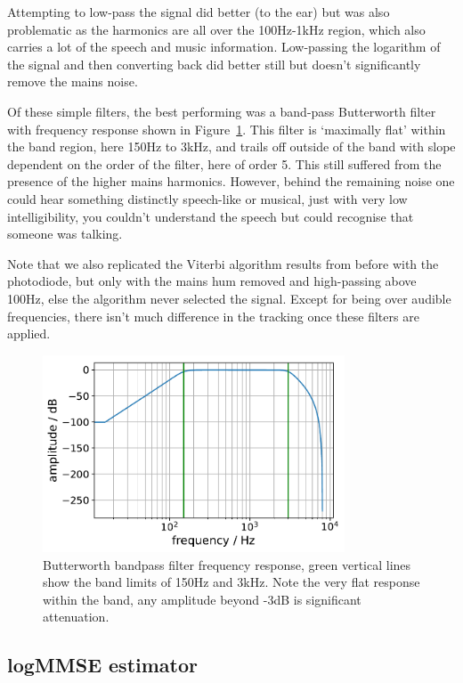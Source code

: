 \documentclass[prb,preprint]{revtex4-1}
\begin{document}
Attempting to low-pass the signal did better (to the ear) but was also problematic as the harmonics are all over the 100Hz-1kHz region, which also carries a lot of the speech and music information. Low-passing the logarithm of the signal and then converting back did better still but doesn’t significantly remove the mains noise.


Of these simple filters, the best performing was a band-pass Butterworth filter with frequency response shown in Figure~\ref{fig:butterworth}. This filter is `maximally flat' within the band region, here 150Hz to 3kHz, and trails off outside of the band with slope dependent on the order of the filter, here of order 5. This still suffered from the presence of the higher mains harmonics. However, behind the remaining noise one could hear something distinctly speech-like or musical, just with very low intelligibility, you couldn’t understand the speech but could recognise that someone was talking.


Note that we also replicated the Viterbi algorithm results from before with the photodiode, but only with the mains hum removed and high-passing above 100Hz, else the algorithm never selected the signal. Except for being over audible frequencies, there isn’t much difference in the tracking once these filters are applied.

\begin{figure}%
	\includegraphics[width=0.8\textwidth]{figures/butterworth_150_3000-cropped.pdf}
	\caption{Butterworth bandpass filter frequency response, green vertical lines show the band limits of 150Hz and 3kHz. Note the very flat response within the band, any amplitude beyond -3dB is significant attenuation.}
	\label{fig:butterworth}
\end{figure}

\subsection{logMMSE estimator}
\end{document}
